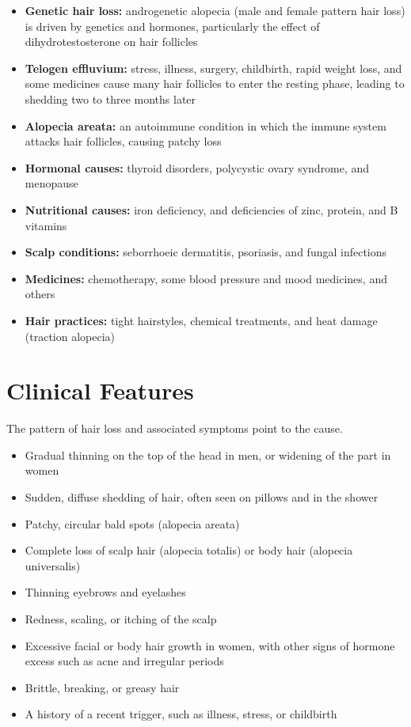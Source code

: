 \begin{itemize}
    \item \textbf{Genetic hair loss:} androgenetic alopecia (male and female pattern hair loss) is driven by genetics and hormones, particularly the effect of dihydrotestosterone on hair follicles
    \item \textbf{Telogen effluvium:} stress, illness, surgery, childbirth, rapid weight loss, and some medicines cause many hair follicles to enter the resting phase, leading to shedding two to three months later
    \item \textbf{Alopecia areata:} an autoimmune condition in which the immune system attacks hair follicles, causing patchy loss
    \item \textbf{Hormonal causes:} thyroid disorders, polycystic ovary syndrome, and menopause
    \item \textbf{Nutritional causes:} iron deficiency, and deficiencies of zinc, protein, and B vitamins
    \item \textbf{Scalp conditions:} seborrhoeic dermatitis, psoriasis, and fungal infections
    \item \textbf{Medicines:} chemotherapy, some blood pressure and mood medicines, and others
    \item \textbf{Hair practices:} tight hairstyles, chemical treatments, and heat damage (traction alopecia)
\end{itemize}

\section*{Clinical Features}
The pattern of hair loss and associated symptoms point to the cause.

\begin{itemize}
    \item Gradual thinning on the top of the head in men, or widening of the part in women
    \item Sudden, diffuse shedding of hair, often seen on pillows and in the shower
    \item Patchy, circular bald spots (alopecia areata)
    \item Complete loss of scalp hair (alopecia totalis) or body hair (alopecia universalis)
    \item Thinning eyebrows and eyelashes
    \item Redness, scaling, or itching of the scalp
    \item Excessive facial or body hair growth in women, with other signs of hormone excess such as acne and irregular periods
    \item Brittle, breaking, or greasy hair
    \item A history of a recent trigger, such as illness, stress, or childbirth
\end{itemize}

